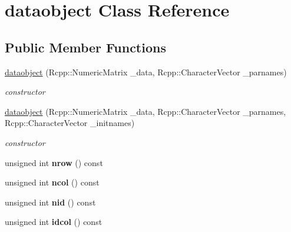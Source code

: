 \hypertarget{classdataobject}{}\section{dataobject Class Reference}
\label{classdataobject}
\subsection*{Public Member Functions}
\begin{DoxyCompactItemize}
\item 
\mbox{\label{classdataobject_a8483694418e230966e74064186c0bfc4}} 
\hyperlink{classdataobject_a8483694418e230966e74064186c0bfc4}{dataobject} (Rcpp\+::\+Numeric\+Matrix \+\_\+data, Rcpp\+::\+Character\+Vector \+\_\+parnames)
\begin{DoxyCompactList}\small\item\em constructor \end{DoxyCompactList}\item 
\mbox{\label{classdataobject_a14d3df0ff6242472550384bee0b57e98}} 
\hyperlink{classdataobject_a14d3df0ff6242472550384bee0b57e98}{dataobject} (Rcpp\+::\+Numeric\+Matrix \+\_\+data, Rcpp\+::\+Character\+Vector \+\_\+parnames, Rcpp\+::\+Character\+Vector \+\_\+initnames)
\begin{DoxyCompactList}\small\item\em constructor \end{DoxyCompactList}\item 
\mbox{\label{classdataobject_a1e71ba1792a9fadbb4b4e0bf67cff101}} 
unsigned int {\bfseries nrow} () const
\item 
\mbox{\label{classdataobject_a8843b2e1b23ee5fe8f40202671ee75ee}} 
unsigned int {\bfseries ncol} () const
\item 
\mbox{\label{classdataobject_a83a26760357ced3f938a1dbf29deece9}} 
unsigned int {\bfseries nid} () const
\item 
\mbox{\label{classdataobject_acaa39a0aac83ba62d13a738ca2a473a8}} 
unsigned int {\bfseries idcol} () const
\item 
\mbox{\label{classdataobject_ac242bbaaf29ec6a93b549f4f649be568}} 

\end{DoxyCompactItemize}
